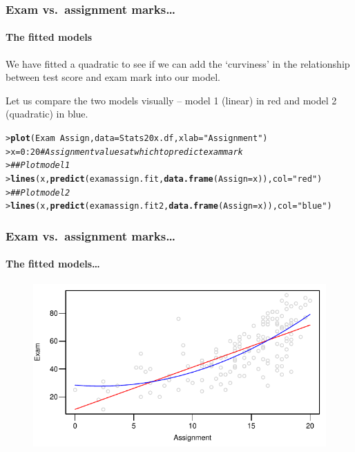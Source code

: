 \documentclass{beamer}\usepackage[]{graphicx}\usepackage[]{xcolor}
\makeatletter
\newcommand{\hlnum}[1]{\textcolor[rgb]{0.686,0.059,0.569}{#1}}%
\newcommand{\hlstr}[1]{\textcolor[rgb]{0.192,0.494,0.8}{#1}}%
\newcommand{\hlcom}[1]{\textcolor[rgb]{0.678,0.584,0.686}{\textit{#1}}}%
\newcommand{\hlopt}[1]{\textcolor[rgb]{0,0,0}{#1}}%
\newcommand{\hlstd}[1]{\textcolor[rgb]{0.345,0.345,0.345}{#1}}%
\newcommand{\hlkwb}[1]{\textcolor[rgb]{0.69,0.353,0.396}{#1}}%
\newcommand{\hlkwc}[1]{\textcolor[rgb]{0.333,0.667,0.333}{#1}}%
\newcommand{\hlkwd}[1]{\textcolor[rgb]{0.737,0.353,0.396}{\textbf{#1}}}%
\newenvironment{kframe}{%
 \def\at@end@of@kframe{}%
 \ifinner\ifhmode%
  \def\at@end@of@kframe{\end{minipage}}%
  \begin{minipage}{\columnwidth}%
 \fi\fi%
 \def\FrameCommand##1{\hskip\@totalleftmargin \hskip-\fboxsep
 \colorbox{shadecolor}{##1}\hskip-\fboxsep
     \hskip-\linewidth \hskip-\@totalleftmargin \hskip\columnwidth}%
 \MakeFramed {\advance\hsize-\width
   \@totalleftmargin\z@ \linewidth\hsize
   \@setminipage}}%
 {\par\unskip\endMakeFramed%
 \at@end@of@kframe}
\newenvironment{knitrout}{}{} %
\makeatother
\begin{document}
\begin{frame}[fragile]
\frametitle{Exam vs.\ assignment marks\ldots}
\framesubtitle{The fitted models}

We have fitted a quadratic to see if we can add the `curviness' in the relationship between test score and exam mark into our model.
\medskip

Let us compare the two models visually -- model 1 (linear) in {\color{red}red} and  model 2 (quadratic) in {\color{blue}blue}.

\begin{knitrout}\scriptsize
{}\color{fgcolor}\begin{kframe}
\begin{alltt}
\hlstd{> }\hlkwd{plot}\hlstd{(Exam}\hlopt{~} \hlstd{Assign,} \hlkwc{data} \hlstd{= Stats20x.df,} \hlkwc{xlab}\hlstd{=}\hlstr{"Assignment"}\hlstd{)}
\hlstd{> }\hlstd{x}\hlkwb{=}\hlnum{0}\hlopt{:}\hlnum{20} \hlcom{#Assignment values at which to predict exam mark}
\hlstd{> }\hlcom{## Plot model 1}
\hlstd{> }\hlkwd{lines}\hlstd{(x,} \hlkwd{predict}\hlstd{(examassign.fit,}\hlkwd{data.frame}\hlstd{(}\hlkwc{Assign}\hlstd{=x)),} \hlkwc{col}\hlstd{=}\hlstr{"red"}\hlstd{)}
\hlstd{> }\hlcom{## Plot model 2}
\hlstd{> }\hlkwd{lines}\hlstd{(x,} \hlkwd{predict}\hlstd{(examassign.fit2,}\hlkwd{data.frame}\hlstd{(}\hlkwc{Assign}\hlstd{=x)),} \hlkwc{col}\hlstd{=}\hlstr{"blue"}\hlstd{)}
\end{alltt}
\end{kframe}
\end{knitrout}
\end{frame}

\begin{frame}[fragile]
\frametitle{Exam vs.\ assignment marks\ldots}
\framesubtitle{The fitted models\ldots}



\begin{figure}
  \centering
  \includegraphics{figure/RC-H04-018}
\end{figure}

\end{frame}
\end{document}

